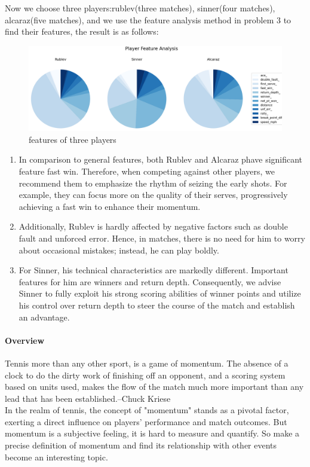\documentclass[12pt, a4paper, oneside]{article}
\theoremstyle{break}
\begin{document}
Now we choose three players:rublev(three matches), sinner(four matches), alcaraz(five matches), and 
we use the feature analysis method in problem 3 to find their features, the result is as follows:
\begin{figure}[H]
    \centering
    \includegraphics[scale=0.4]{imgs/9.png}
    \caption{features of three players}
\end{figure}
\begin{enumerate}
    \item In comparison to general features, both Rublev and Alcaraz phave significant feature fast win. 
    Therefore, when competing against other players, we recommend them to emphasize the rhythm of seizing 
    the early shots. For example, they can focus more on the quality of their serves, 
    progressively achieving a fast win to enhance their momentum. 
    \item Additionally, Rublev is hardly affected by negative factors such as double fault and 
    unforced error. Hence, in matches, there is no need for him to worry about occasional mistakes; 
    instead, he can play boldly.
    \item For Sinner, his technical characteristics are markedly different. 
    Important features for him are winners and return depth. Consequently, 
    we advise Sinner to fully exploit his strong scoring abilities of winner points
    and utilize his control over return depth to steer the course of the match and establish an advantage.

\end{enumerate}

\paragraph{Overview}
Tennis more than any other sport, is a game of momentum. 
The absence of a clock to do the dirty work of finishing off an opponent, 
and a scoring system based on units used, makes the flow of the match much more important than any 
lead that has been established.--Chuck Kriese\\
In the realm of tennis, the concept of "momentum" stands as a pivotal factor, 
exerting a direct influence on players' performance and match outcomes. But momentum
is a subjective feeling, it is hard to measure and quantify. So make a precise definition 
of momentum and find its relationship with other events become an interesting topic.
\end{document}
